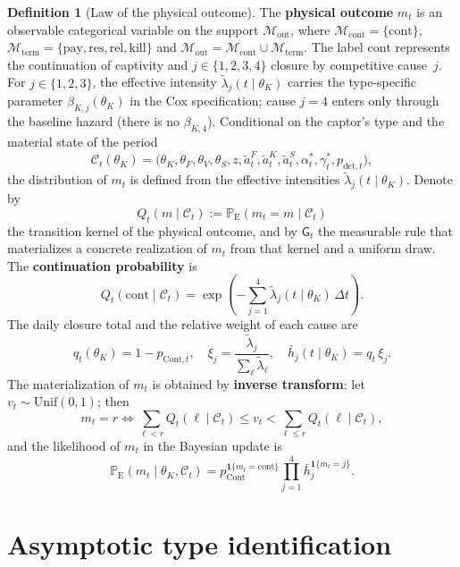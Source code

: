 \documentclass[ecta,nameyear,final,supplement]{econsocart}
\numberwithin{equation}{section}
\numberwithin{table}{section}
\theoremstyle{definition}
\newtheorem{definition}[theorem]{Definition}
\newcommand{\ProbE}{\mathbb{P}_{\mathrm{E}}}
\newcommand{\Unif}{\mathrm{Unif}}
\begin{document}
\begin{definition}[Law of the physical outcome]
\label{def:desenlace-fisico-mt}
The \textbf{physical outcome} $m_t$ is an observable categorical variable on
the support $\mathcal{M}_{\mathrm{out}}$, where
$\mathcal{M}_{\mathrm{cont}}=\{\mathrm{cont}\}$,
$\mathcal{M}_{\mathrm{term}}=\{\mathrm{pay},\mathrm{res},\mathrm{rel},\mathrm{kill}\}$
and $\mathcal{M}_{\mathrm{out}}=\mathcal{M}_{\mathrm{cont}}\cup\mathcal{M}_{\mathrm{term}}$.
The label $\mathrm{cont}$ represents the continuation of captivity and
$j\in\{1,2,3,4\}$ closure by competitive cause~$j$. For $j\in\{1,2,3\}$, the
effective intensity $\tilde\lambda_j(t\mid\theta_K)$ carries the type-specific
parameter $\beta_{K,j}(\theta_K)$ in the Cox specification; cause $j=4$ enters
only through the baseline hazard (there is no $\beta_{K,4}$). Conditional on the
captor's type and the material state of the period
\[
\mathcal{C}_t(\theta_K)
=\bigl(\theta_K,\theta_F,\theta_V,\theta_S,z,
\tilde{a}_t^F,\tilde{a}_t^K,\tilde{a}_t^S,
\alpha_t^\ast,\gamma_t^\ast,p_{\mathrm{det},t}\bigr),
\]
the distribution of $m_t$ is defined from the effective intensities
$\tilde\lambda_j(t\mid\theta_K)$. Denote by
\[
Q_t(m\mid\mathcal C_t):=\ProbE(m_t=m\mid\mathcal C_t)
\]
the transition kernel of the physical outcome, and by $\mathsf{G}_t$ the
measurable rule that materializes a concrete realization of $m_t$ from that
kernel and a uniform draw. The \textbf{continuation probability} is
\[
Q_t(\mathrm{cont}\mid\mathcal{C}_t)
=\exp\!\left(-\sum_{j=1}^{4}\tilde\lambda_j(t\mid\theta_K)\,\Delta t\right).
\]
The daily closure total and the relative weight of each cause are
\[
q_t(\theta_K)=1-p_{\mathrm{Cont},t},\quad
\xi_j=\frac{\tilde\lambda_j}{\sum_\ell\tilde\lambda_\ell},\quad
\bar h_j(t\mid\theta_K)=q_t\,\xi_j.
\]
The materialization of $m_t$ is obtained by \textbf{inverse transform}:
let $v_t\sim\Unif(0,1)$; then
\[
m_t=r
\iff
\sum_{\ell<r}Q_t(\ell\mid\mathcal{C}_t)\le v_t
<\sum_{\ell\le r}Q_t(\ell\mid\mathcal{C}_t),
\]
and the likelihood of $m_t$ in the Bayesian update is
\[
\ProbE(m_t\mid\theta_K,\mathcal{C}_t)
=p_{\mathrm{Cont}}^{\mathbf{1}\{m_t=\mathrm{cont}\}}
\prod_{j=1}^{4}\bar h_j^{\mathbf{1}\{m_t=j\}}.
\]
\end{definition}

\section{Asymptotic type identification}
\label{sec:id-asintotica}
\end{document}

